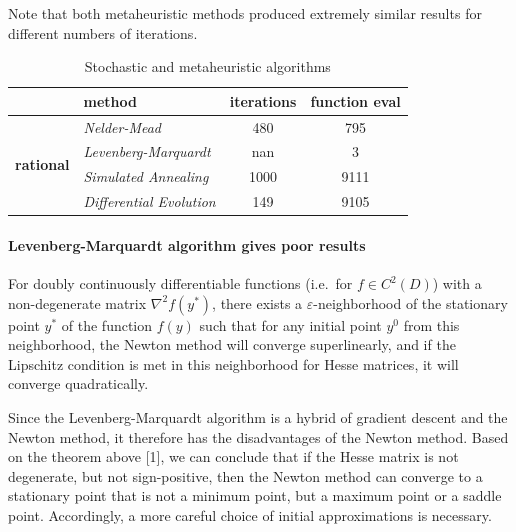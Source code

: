 Note that both metaheuristic methods produced extremely similar results for different numbers of iterations.

\begin{table}[ht]
\caption{Stochastic and metaheuristic algorithms}
\begin{tabular}{l|l|c|c|}
\cline{2-4}
                                                         & \textbf{method}                 & \multicolumn{1}{l|}{\textbf{iterations}} & \multicolumn{1}{l|}{\textbf{function eval}} \\ \hline
\multicolumn{1}{|l|}{\multirow{4}{*}{\textbf{rational}}} & \textit{Nelder-Mead}            & 480                                      & 795                                         \\ \cline{2-4}
\multicolumn{1}{|l|}{}                                   & \textit{Levenberg-Marquardt}    & nan                                      & 3                                           \\ \cline{2-4}
\multicolumn{1}{|l|}{}                                   & \textit{Simulated Annealing}    & 1000                                     & 9111                                        \\ \cline{2-4}
\multicolumn{1}{|l|}{}                                   & \textit{Differential Evolution} & 149                                      & 9105                                        \\ \hline
\end{tabular}
\label{tbl:stohmeta}
\end{table}

\paragraph{Levenberg-Marquardt algorithm gives poor results}

\begin{theorem}
    \label{theorem:conv_newton}
    For doubly continuously differentiable functions (i.e.\ for $f \in C^2(D)$) with a non-degenerate matrix $\nabla^2 f(y^*)$, there exists a $\varepsilon$-neighborhood of the stationary point $y^*$ of the function $f(y)$ such that for any initial point $y^0$ from this neighborhood, the Newton method will converge superlinearly, and if the Lipschitz condition is met in this neighborhood for Hesse matrices, it will converge quadratically.
\end{theorem}

Since the Levenberg-Marquardt algorithm is a hybrid of gradient descent and the Newton method, it therefore has the disadvantages of the Newton method.
Based on the theorem above [1], we can conclude that if the Hesse matrix is not degenerate, but not sign-positive, then the Newton method can converge to a stationary point that is not a minimum point, but a maximum point or a saddle point.
Accordingly, a more careful choice of initial approximations is necessary.

